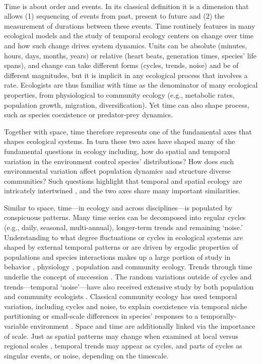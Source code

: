 \documentclass[11pt,a4paper,oneside]{article}
\begin{document}
\\

\noindent  Time is about order and events. In its classical definition it is a dimension that allows (1) sequencing of events from past, present to future and (2) the measurement of durations between these events. Time routinely features in many ecological models and the study of temporal ecology centers on change over time and how such change drives system dynamics. Units can be absolute (minutes, hours, days, months, years) or relative (heart beats, generation times, species’ life spans), and change can take different forms (cycles, trends, noise) and be of different magnitudes, but it is implicit in any ecological process that involves a rate. Ecologists are thus familiar with time as the denominator of many ecological properties, from physiological to community ecology (e.g., metabolic rates, population growth, migration, diversification). Yet time can also shape process, such as species coexistence or predator-prey dynamics. 

Together with space, time therefore represents one of the fundamental axes that shapes ecological systems. In turn these two axes have shaped many of the fundamental questions in ecology including, how do spatial and temporal variation in the environment control species' distributions? How does such environmental variation affect population dynamics and structure diverse communities? Such questions highlight that temporal and spatial ecology are intricately intertwined \citep{delcourt1983}, and the two axes share many important similarities.

Similar to space, time---in ecology and across disciplines---is populated by conspicuous patterns. Many time series can be decomposed into regular cycles (e.g., daily, seasonal, multi-annual), longer-term trends and remaining `noise.'  Understanding to what degree fluctuations or cycles in ecological systems are shaped by external temporal patterns or are driven by ergodic properties of populations and species interactions makes up a large portion of study in behavior \citep{macarthur1958}, physiology \citep{Lambers:2008jb}, population  \citep{May1976} and community \citep{Chesson:1997dz} ecology. Trends through time underlie the concept of succession \citep{clementsbook}.  The random variations outside of cycles and trends---temporal `noise'---have also received extensive study by both population \citep{Kaitala1997,Bjornstad:1999kl} and community ecologists \citep{Chesson:1997dz}. Classical community ecology has used temporal variation, including cycles and noise, to explain coexistence via temporal niche partitioning or small-scale differences in species' responses to a temporally-variable environment \citep{macarthur1958,Hutchinson:1961ui,Chesson:1997dz}. Space and time are additionally linked via the importance of scale. Just as spatial patterns may change when examined at local versus regional scales \citep[e.g.,][]{Fridley:2007ct}, temporal trends may appear as cycles, and parts of cycles as singular events, or noise, depending on the timescale. 
\end{document}
